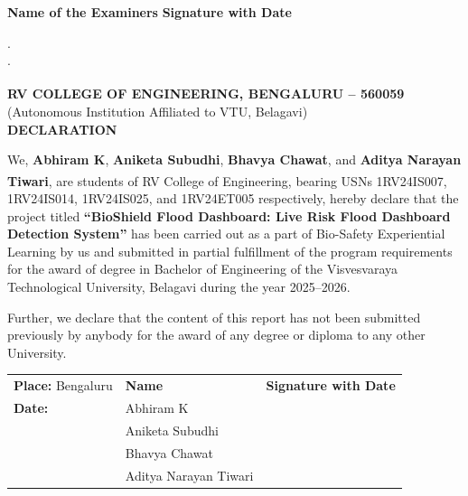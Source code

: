 \documentclass[12pt,a4paper]{report}
\begin{document}
\vspace{40pt}
\noindent\textbf{Name of the Examiners} \hfill \textbf{Signature with Date}

\vspace{12pt}
. \underline{\hspace{8cm}} \\[16pt]
. \underline{\hspace{8cm}}

\setcounter{page}{1}

\newpage
\thispagestyle{plain}
\vspace*{-1.5cm}
\begin{center}
{\large\textbf{RV COLLEGE OF ENGINEERING\textsuperscript{\textregistered}, BENGALURU -- 560059}}\\
{\normalsize (Autonomous Institution Affiliated to VTU, Belagavi)}\\[20pt]
{\Large\textbf{DECLARATION}}
\end{center}

\vspace{12pt}
\noindent We, \textbf{Abhiram K}, \textbf{Aniketa Subudhi}, \textbf{Bhavya Chawat}, and \textbf{Aditya Narayan Tiwari}, are students of RV College of Engineering\textsuperscript{\textregistered}, bearing USNs 1RV24IS007, 1RV24IS014, 1RV24IS025, and 1RV24ET005 respectively, hereby declare that the project titled \textbf{``BioShield Flood Dashboard: Live Risk Flood Dashboard Detection System''} has been carried out as a part of Bio-Safety Experiential Learning by us and submitted in partial fulfillment of the program requirements for the award of degree in Bachelor of Engineering of the Visvesvaraya Technological University, Belagavi during the year 2025--2026.

\vspace{12pt}
\noindent Further, we declare that the content of this report has not been submitted previously by anybody for the award of any degree or diploma to any other University.

\vspace{36pt}
\noindent
\begin{tabular}{p{5cm} p{5cm} p{4cm}}
\textbf{Place:} Bengaluru & \textbf{Name} & \textbf{Signature with Date} \\[12pt]
\textbf{Date:}            & Abhiram K & \\[12pt]
                          & Aniketa Subudhi & \\[12pt]
                          & Bhavya Chawat & \\[12pt]
                          & Aditya Narayan Tiwari & \\
\end{tabular}
\end{document}
